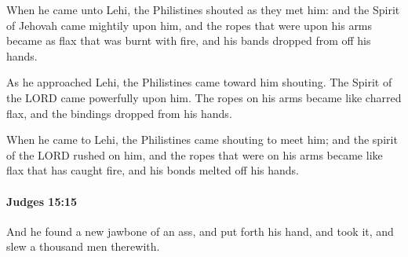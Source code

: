 			\begin{versebox}
					\item[BHS] 
					\item[ASV] When he came unto Lehi, the Philistines shouted as they met him: and the Spirit of Jehovah came mightily upon him, and the ropes that were upon his arms became as flax that was burnt with fire, and his bands dropped from off his hands.
					\item[NIV] As he approached Lehi, the Philistines came toward him shouting. The Spirit of the LORD came powerfully upon him. The ropes on his arms became like charred flax, and the bindings dropped from his hands.
					\item[NRSV] When he came to Lehi, the Philistines came shouting to meet him; and the spirit of the LORD rushed on him, and the ropes that were on his arms became like flax that has caught fire, and his bonds melted off his hands.
			\end{versebox}

		\paragraph{Judges 15:15} %
			\label{JUDGES-15-15}

			And he found a new jawbone of an ass, and put forth his hand, and took it, and slew a thousand men therewith.

